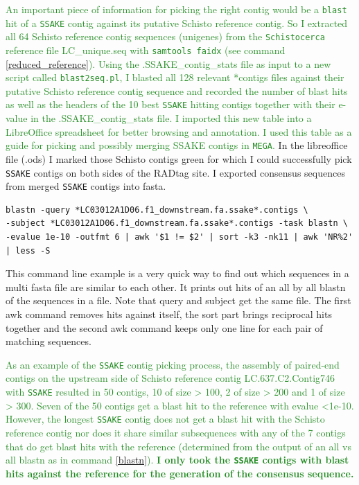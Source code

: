 \documentclass{article}\usepackage[]{graphicx}\usepackage[]{color}
\newcommand{\roger}[1]{ \textcolor[named]{ForestGreen}{#1} }
\begin{document}
\roger{An important piece of information for picking the right contig would be a \texttt{blast} hit of a \texttt{SSAKE} contig against its putative Schisto reference contig. So I extracted all 64 Schisto reference contig sequences (unigenes) from the \texttt{Schistocerca} reference file \textsf{LC\_unique.seq} with \texttt{samtools faidx} (see command \ref{reduced_reference}). Using the \textsf{.SSAKE\_contig\_stats} file as input to a new script called \texttt{blast2seq.pl}, I blasted all 128 relevant *contigs files against their putative Schisto reference contig sequence and recorded the number of blast hits as well as the headers of the 10 best \texttt{SSAKE} hitting contigs together with their e-value in the \textsf{.SSAKE\_contig\_stats} file. I imported this new table into a LibreOffice spreadsheet for better browsing and annotation. I used this table as a guide for picking and possibly merging SSAKE contigs in \texttt{MEGA}.} In the libreoffice file (.ods) I marked those Schisto contigs green for which I could successfully pick \texttt{SSAKE} contigs on both sides of the RADtag site. I exported consensus sequences from merged \texttt{SSAKE} contigs into fasta.

\begin{command}
\captionsetup{type=command}
\begin{Verbatim}
blastn -query *LC03012A1D06.f1_downstream.fa.ssake*.contigs \
-subject *LC03012A1D06.f1_downstream.fa.ssake*.contigs -task blastn \
-evalue 1e-10 -outfmt 6 | awk '$1 != $2' | sort -k3 -nk11 | awk 'NR%2' | less -S
\end{Verbatim}
\caption{This command line example is a very quick way to find out which sequences in a multi fasta file are similar to each other. It prints out hits of an all by all blastn of the sequences in a file. Note that query and subject get the same file. The first awk command removes hits against itself, the sort part brings reciprocal hits together and the second awk command keeps only one line for each pair of matching sequences.}
\label{blastn}
\end{command}

\roger{As an example of the \texttt{SSAKE} contig picking process, the assembly of paired-end contigs on the upstream side of Schisto reference contig LC.637.C2.Contig746 with \texttt{SSAKE} resulted in 50 contigs, 10 of size > 100, 2 of size > 200 and 1 of size > 300. Seven of the 50 contigs get a blast hit to the reference with evalue <1e-10. However, the longest \texttt{SSAKE} contig does not get a blast hit with the Schisto reference contig nor does it share similar subsequences with any of the 7 contigs that do get blast hits with the reference (determined from the output of an all vs all blastn as in command \ref{blastn}). \textbf{I only took the \texttt{SSAKE} contigs with blast hits against the reference for the generation of the consensus sequence.} }
\end{document}
